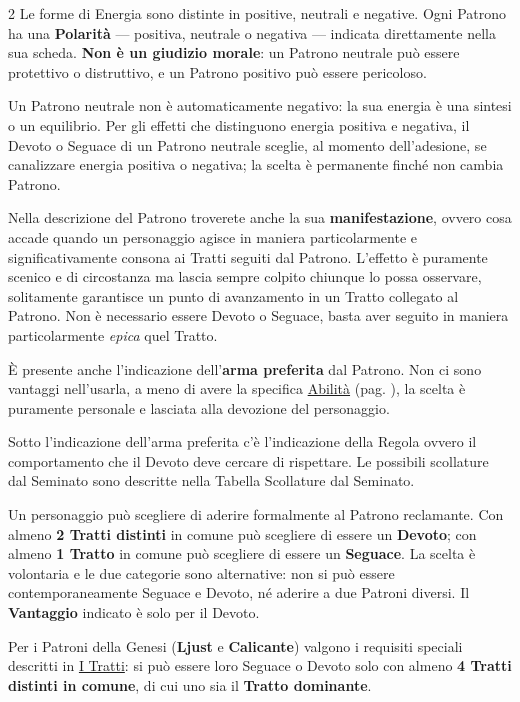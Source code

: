 \begin{multicols}{2}
Le forme di Energia sono distinte in positive, neutrali e negative. Ogni Patrono ha una \textbf{Polarità} — positiva, neutrale o negativa — indicata direttamente nella sua scheda. \textbf{Non è un giudizio morale}: un Patrono neutrale può essere protettivo o distruttivo, e un Patrono positivo può essere pericoloso.

Un Patrono neutrale non è automaticamente negativo: la sua energia è una sintesi o un equilibrio. Per gli effetti che distinguono energia positiva e negativa, il Devoto o Seguace di un Patrono neutrale sceglie, al momento dell'adesione, se canalizzare energia positiva o negativa; la scelta è permanente finché non cambia Patrono.

Nella descrizione del Patrono troverete anche la sua \textbf{manifestazione}, ovvero cosa accade quando un personaggio agisce in maniera particolarmente e significativamente consona ai Tratti seguiti dal Patrono. L'effetto è puramente scenico e di circostanza ma lascia sempre colpito chiunque lo possa osservare, solitamente garantisce un punto di avanzamento in un Tratto collegato al Patrono. Non è necessario essere Devoto o Seguace, basta aver seguito in maniera particolarmente \emph{epica} quel Tratto.

È presente anche l'indicazione dell'\textbf{arma preferita} dal Patrono. Non ci sono vantaggi nell'usarla, a meno di avere la specifica \hyperlink{Il Patrono è la mia Arma}{Abilità} (pag. \pageref{Il Patrono è la mia Arma}), la scelta è puramente personale e lasciata alla devozione del personaggio.

Sotto l'indicazione dell'arma preferita c'è l'indicazione della Regola  ovvero il comportamento che il Devoto deve cercare di rispettare. Le possibili scollature dal Seminato sono descritte nella Tabella Scollature dal Seminato.

Un personaggio può scegliere di aderire formalmente al Patrono reclamante. Con almeno \textbf{2 Tratti distinti} in comune può scegliere di essere un \textbf{Devoto}; con almeno \textbf{1 Tratto} in comune può scegliere di essere un \textbf{Seguace}. La scelta è volontaria e le due categorie sono alternative: non si può essere contemporaneamente Seguace e Devoto, né aderire a due Patroni diversi. Il \textbf{Vantaggio} indicato è solo per il Devoto.

Per i Patroni della Genesi (\textbf{Ljust} e \textbf{Calicante}) valgono i requisiti speciali descritti in \hyperlink{tratti}{I Tratti}: si può essere loro Seguace o Devoto solo con almeno \textbf{4 Tratti distinti in comune}, di cui uno sia il \textbf{Tratto dominante}.


\end{multicols}
